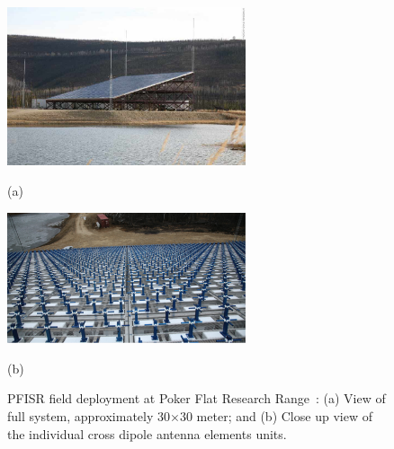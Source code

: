 
\begin{figure}[htb]
  \begin{minipage}[t]{0.49\linewidth}\centering
    \includegraphics[width=7cm]{amisrimage2}
    \medskip
    \centerline{(a)}
  \end{minipage}\hfill
  \begin{minipage}[t]{0.49\linewidth}\centering
    \includegraphics[width=7cm]{amisrface}
    \medskip
    \centerline{(b)}
  \end{minipage}
  \caption{PFISR field deployment at Poker Flat Research Range~\cite{Valentic:2013jg}: (a) View of full system, approximately 30$\times$30 meter; and (b) Close up view of the individual cross dipole antenna elements units. }
  \label{fig:amisrpic}
\end{figure}

